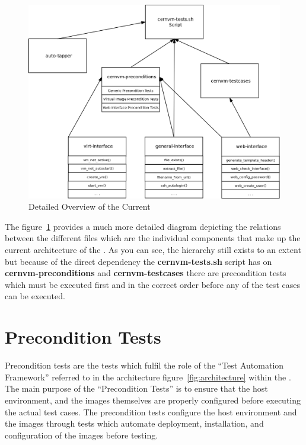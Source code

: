 \begin{figure}[hbp]
	\begin{center}
		\includegraphics[scale=0.25]{img/detailed_framework.png}
	\end{center}
	\caption{Detailed Overview of the Current \cernvmtestframework}
	\label{fig:detailedarchitecture}
\end{figure}

The figure~\ref{fig:detailedarchitecture} provides a much more detailed diagram depicting the relations between the different files which are the
individual components that make up the current architecture of the \cernvmtestframework. As you can see, the hierarchy still exists to an extent
but because of the direct dependency the {\bf cernvm-tests.sh} script has on {\bf cernvm-preconditions} and {\bf cernvm-testcases} there are
precondition tests which must be executed first and in the correct order before any of the test cases can be executed.




\section{Precondition Tests}
\label{sec:preconditiontests}

Precondition tests are the tests which fulfil the role of the ``Test Automation Framework'' referred to in the \tapper architecture
figure~\ref{fig:architecture} within the \cernvmtestframework. The main purpose of the ``Precondition Tests'' is to ensure that the
host environment, and the \cernvm images themselves are properly configured before executing the actual \cernvmreleasetesting test
cases. The precondition tests configure the host environment and the \cernvm images through tests which automate deployment, 
installation, and configuration of the \cernvm images before testing.

